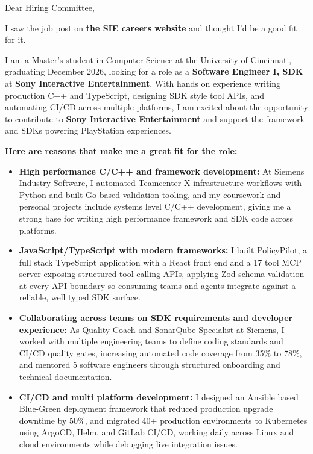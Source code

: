 \documentclass[11pt]{letter}
\date{}
\begin{document}
\begin{letter}{}

\opening{Dear Hiring Committee,}

I saw the job post on \textbf{the SIE careers website} and thought I'd be a good fit for it.

I am a Master's student in Computer Science at the University of Cincinnati, graduating December 2026, looking for a role as a \textbf{Software Engineer I, SDK} at \textbf{Sony Interactive Entertainment}. With hands on experience writing production C++ and TypeScript, designing SDK style tool APIs, and automating CI/CD across multiple platforms, I am excited about the opportunity to contribute to \textbf{Sony Interactive Entertainment} and support the framework and SDKs powering PlayStation experiences.

\textbf{Here are reasons that make me a great fit for the role:}

\begin{itemize}[leftmargin=*, itemsep=0.45em]
    \item \textbf{High performance C/C++ and framework development:} At Siemens Industry Software, I automated Teamcenter X infrastructure workflows with Python and built Go based validation tooling, and my coursework and personal projects include systems level C/C++ development, giving me a strong base for writing high performance framework and SDK code across platforms.

    \item \textbf{JavaScript/TypeScript with modern frameworks:} I built PolicyPilot, a full stack TypeScript application with a React front end and a 17 tool MCP server exposing structured tool calling APIs, applying Zod schema validation at every API boundary so consuming teams and agents integrate against a reliable, well typed SDK surface.

    \item \textbf{Collaborating across teams on SDK requirements and developer experience:} As Quality Coach and SonarQube Specialist at Siemens, I worked with multiple engineering teams to define coding standards and CI/CD quality gates, increasing automated code coverage from 35\% to 78\%, and mentored 5 software engineers through structured onboarding and technical documentation.

    \item \textbf{CI/CD and multi platform development:} I designed an Ansible based Blue-Green deployment framework that reduced production upgrade downtime by 50\%, and migrated 40+ production environments to Kubernetes using ArgoCD, Helm, and GitLab CI/CD, working daily across Linux and cloud environments while debugging live integration issues.


\end{itemize}
\end{letter}
\end{document}
